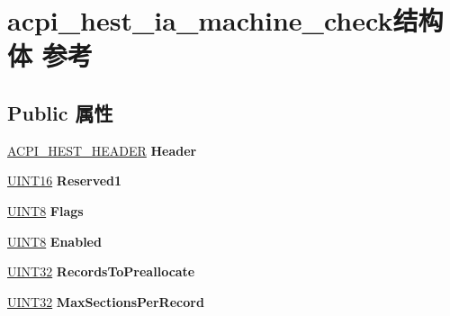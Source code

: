 \hypertarget{structacpi__hest__ia__machine__check}{}\section{acpi\+\_\+hest\+\_\+ia\+\_\+machine\+\_\+check结构体 参考}
\label{structacpi__hest__ia__machine__check}
\subsection*{Public 属性}
\begin{DoxyCompactItemize}
\item 
\mbox{\label{structacpi__hest__ia__machine__check_a198006adf278d8b23141338e3f5f21d4}} 
\hyperlink{structacpi__hest__header}{A\+C\+P\+I\+\_\+\+H\+E\+S\+T\+\_\+\+H\+E\+A\+D\+ER} {\bfseries Header}
\item 
\mbox{\label{structacpi__hest__ia__machine__check_a78fedb63d69837ee697d174e1f5bfe6c}} 
\hyperlink{_processor_bind_8h_a09f1a1fb2293e33483cc8d44aefb1eb1}{U\+I\+N\+T16} {\bfseries Reserved1}
\item 
\mbox{\label{structacpi__hest__ia__machine__check_a39aa941b3607fe9fc5da26b6acb6b888}} 
\hyperlink{_processor_bind_8h_ab27e9918b538ce9d8ca692479b375b6a}{U\+I\+N\+T8} {\bfseries Flags}
\item 
\mbox{\label{structacpi__hest__ia__machine__check_a46b844d84fe4bc6024f8a1dadb1d42e4}} 
\hyperlink{_processor_bind_8h_ab27e9918b538ce9d8ca692479b375b6a}{U\+I\+N\+T8} {\bfseries Enabled}
\item 
\mbox{\label{structacpi__hest__ia__machine__check_a99685fa3a2ae31dcf4c6fc5c8fb2ad43}} 
\hyperlink{_processor_bind_8h_ae1e6edbbc26d6fbc71a90190d0266018}{U\+I\+N\+T32} {\bfseries Records\+To\+Preallocate}
\item 
\mbox{\label{structacpi__hest__ia__machine__check_ab67869d46fc3a596a0399c815271cff8}} 
\hyperlink{_processor_bind_8h_ae1e6edbbc26d6fbc71a90190d0266018}{U\+I\+N\+T32} {\bfseries Max\+Sections\+Per\+Record}

\end{DoxyCompactItemize}
